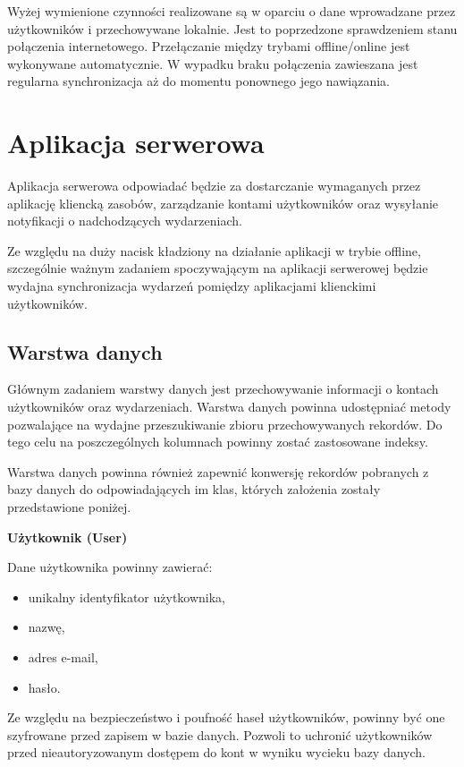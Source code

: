 Wyżej wymienione czynności realizowane są w oparciu o dane wprowadzane przez użytkowników i przechowywane lokalnie. Jest to poprzedzone sprawdzeniem stanu połączenia internetowego. Przełączanie między trybami offline/online jest wykonywane automatycznie. W wypadku braku połączenia zawieszana jest regularna synchronizacja aż do momentu ponownego jego nawiązania.

\section{Aplikacja serwerowa}
\label{sec:appSerw}

Aplikacja serwerowa odpowiadać będzie za dostarczanie wymaganych przez aplikację kliencką zasobów, zarządzanie kontami użytkowników oraz wysyłanie notyfikacji o nadchodzących wydarzeniach.

Ze względu na duży nacisk kładziony na działanie aplikacji w trybie offline, szczególnie ważnym zadaniem spoczywającym na aplikacji serwerowej będzie wydajna synchronizacja wydarzeń pomiędzy aplikacjami klienckimi użytkowników.

\subsection{Warstwa danych}
\label{warstwaDanych}

Głównym zadaniem warstwy danych jest przechowywanie informacji o kontach użytkowników oraz wydarzeniach. Warstwa danych powinna udostępniać metody pozwalające na wydajne przeszukiwanie zbioru przechowywanych rekordów. Do tego celu na poszczególnych kolumnach powinny zostać zastosowane indeksy. 

Warstwa danych powinna również zapewnić konwersję rekordów pobranych z bazy danych do odpowiadających im klas, których założenia zostały przedstawione poniżej.

\textbf{Użytkownik (User)}

Dane użytkownika powinny zawierać:

\begin{itemize}
\item unikalny identyfikator użytkownika,
\item nazwę,
\item adres e-mail,
\item hasło.
\end{itemize}

Ze względu na bezpieczeństwo i poufność haseł użytkowników, powinny być one szyfrowane przed zapisem w bazie danych. Pozwoli to uchronić użytkowników przed nieautoryzowanym dostępem do kont w wyniku wycieku bazy danych.

